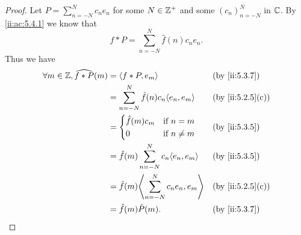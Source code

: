\begin{proof}
  Let \(P = \sum_{n = -N}^N c_n e_n\) for some \(N \in \mathbb{Z}^+\) and some \((c_n)_{n = -N}^N\) in \(\mathbb{C}\).
  By \cref{ii:ac:5.4.1} we know that
  \[
    f * P = \sum_{n = -N}^N \hat{f}(n) c_n e_n.
  \]
  Thus we have
  \begin{align*}
    \forall m \in \Z, \widehat{f * P}(m) & = \inner{f * P, e_m}                               &  & \by{ii:5.3.7}    \\
                                         & = \sum_{n = -N}^N \hat{f}(n) c_n \inner{e_n, e_m}  &  & \by{ii:5.2.5}[c] \\
                                         & = \begin{dcases}
                                               \hat{f}(m) c_m & \text{if } n = m    \\
                                               0              & \text{if } n \neq m
                                             \end{dcases}            &  & \by{ii:5.3.5}                             \\
                                         & = \hat{f}(m) \sum_{n = -N}^N c_n \inner*{e_n, e_m} &  & \by{ii:5.3.5}    \\
                                         & = \hat{f}(m) \inner*{\sum_{n = -N}^N c_n e_n, e_m} &  & \by{ii:5.2.5}[c] \\
                                         & = \hat{f}(m) \hat{P}(m).                           &  & \by{ii:5.3.7}
  \end{align*}


\end{proof}
